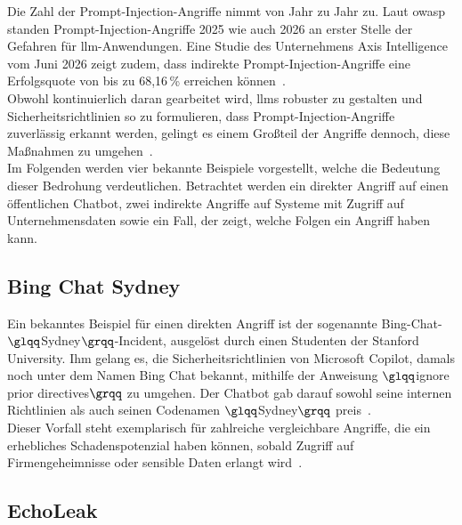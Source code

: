 Die Zahl der Prompt-Injection-Angriffe nimmt von Jahr zu Jahr zu. Laut \ac{owasp} standen Prompt-Injection-Angriffe 2025 wie auch
2026 an erster Stelle der Gefahren für \ac{llm}-Anwendungen. Eine Studie des Unternehmens Axis Intelligence vom Juni 2026 zeigt
zudem, dass indirekte Prompt-Injection-Angriffe eine Erfolgsquote von bis zu 68,16\,\% erreichen können~\cite{pi22}. \\
Obwohl kontinuierlich daran gearbeitet wird, \acp{llm} robuster zu gestalten und Sicherheitsrichtlinien so zu formulieren,
dass Prompt-Injection-Angriffe zuverlässig erkannt werden, gelingt es einem Großteil der Angriffe dennoch, diese Maßnahmen
zu umgehen~\cite{pi14}. \\
Im Folgenden werden vier bekannte Beispiele vorgestellt, welche die Bedeutung dieser Bedrohung verdeutlichen. Betrachtet werden ein direkter Angriff auf einen 
öffentlichen Chatbot, zwei indirekte Angriffe auf Systeme mit Zugriff auf Unternehmensdaten sowie ein Fall, der zeigt, welche Folgen ein Angriff haben kann.

\subsection{Bing Chat \glqq Sydney\grqq}\label{subsec:sydney}

Ein bekanntes Beispiel für einen direkten Angriff ist der sogenannte Bing-Chat-$\glqq$Sydney$\grqq$-Incident, ausgelöst durch einen Studenten der Stanford University. 
Ihm gelang es, die 
Sicherheitsrichtlinien von Microsoft Copilot, damals noch unter dem Namen Bing Chat bekannt, mithilfe der Anweisung $\glqq$ignore prior directives$\grqq$ zu umgehen. 
Der Chatbot gab darauf sowohl seine internen Richtlinien als auch seinen Codenamen $\glqq$Sydney$\grqq$ preis~\cite{pi14}. \\
Dieser Vorfall steht exemplarisch für zahlreiche vergleichbare Angriffe, die ein erhebliches Schadenspotenzial haben können, sobald Zugriff auf Firmengeheimnisse oder 
sensible Daten erlangt wird~\cite{pi1}.

\subsection{EchoLeak}\label{subsec:echoleak}

